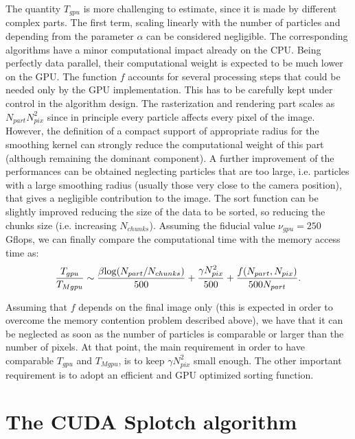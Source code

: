 \documentclass[11pt]{article}
\begin{document}
The quantity $T_{gpu}$ is more challenging to estimate, since it is made by different 
complex parts. The first term, scaling linearly with the number of particles and depending 
from the parameter $\alpha$ can be considered negligible. The corresponding 
algorithms have a minor computational impact already on the CPU. Being perfectly 
data parallel, their computational weight is expected to be much lower on the GPU.
The function $f$ accounts for several processing steps that could be needed only
by the GPU implementation. This has to be carefully kept under control in 
the algorithm design. The rasterization and rendering part scales as $N_{part}
N_{pix}^2$ since in principle every particle affects every pixel of the image.
However, the definition of a compact support of appropriate radius for the smoothing
kernel can strongly reduce the computational weight of this part (although remaining
the dominant component). A further improvement of the performances can be obtained
neglecting particles that are too large, i.e. particles with a large smoothing radius 
(usually those very close to the camera position), that gives a negligible
contribution to the image. The sort function can be slightly improved reducing 
the size of the data to be sorted, so reducing the chunks size (i.e. increasing 
$N_{chunks}$). 
Assuming the fiducial value $\nu_{gpu} = 250$ Gflops, we can finally compare the computational time with the memory access time as:
\begin{equation}
{T_{gpu}\over T_{Mgpu}} \sim 
{\beta {\rm log}(N_{part}/N_{chunks})\over 500} +
{\gamma N_{pix}^2\over 500} + 
{f(N_{part},N_{pix})\over 500 N_{part}}.
\end{equation}

Assuming that $f$ depends on the final image only (this is expected in order 
to overcome the memory contention problem described above), we have that 
it can be neglected as soon as the number of particles is comparable or larger 
than the number of pixels. At that point, the main requirement in order 
to have comparable $T_{gpu}$ and $T_{Mgpu}$, is to keep $\gamma N_{pix}^2$
small enough. The other important requirement is to adopt an efficient 
and GPU optimized sorting function. 

\section{The CUDA Splotch algorithm}
\end{document}
